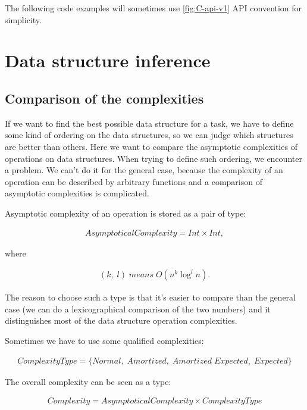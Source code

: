 \documentclass[a4paper,11pt]{article}
\begin{document}
        The following code examples will sometimes use \autoref{fig:C-api-v1} API convention for simplicity.

\section{Data structure inference}

	\subsection{Comparison of the complexities}

		If we want to find the best possible data structure for a task, we have to define some kind of ordering
		on the data structures, so we can judge which structures are better than others. Here we want to compare the
		asymptotic complexities of operations on data structures. When trying to define such ordering, we
		encounter a problem.  We can't do it for the general case, because the complexity of an operation
        can be described by arbitrary functions and a comparison of asymptotic complexities is complicated.

		Asymptotic complexity of an operation is stored as a pair of type:

		\begin{eqnarray}
			AsymptoticalComplexity = Int \times Int,
		\end{eqnarray}

		where

		\begin{eqnarray}
			(k, \; l) \; means \; O(n^k \log^l{ n}).
		\end{eqnarray}

		The reason to choose such a type is that it's easier to compare than the general case (we can do a
		lexicographical comparison of the two numbers) and it distinguishes most of the data structure operation
		complexities.

		Sometimes we have to use some qualified complexities:

		\begin{eqnarray}
			ComplexityType = \{ Normal, \; Amortized, \; Amortized \;Expected, \; Expected \}
		\end{eqnarray}

		The overall complexity can be seen as a type:

		\begin{eqnarray}
			Complexity = AsymptoticalComplexity \times ComplexityType
		\end{eqnarray}
\end{document}
